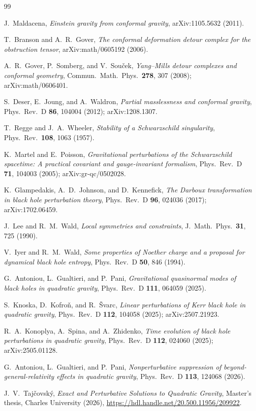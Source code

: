 \documentclass[11pt]{article}
\theoremstyle{definition}
\theoremstyle{remark}
\begin{document}
\begin{thebibliography}{99}

J.~Maldacena,
\emph{Einstein gravity from conformal gravity},
arXiv:1105.5632 (2011).

T.~Branson and A.~R.~Gover,
\emph{The conformal deformation detour complex for the obstruction tensor},
arXiv:math/0605192 (2006).

A.~R.~Gover, P.~Somberg, and V.~Sou\v cek,
\emph{Yang--Mills detour complexes and conformal geometry},
Commun.\ Math.\ Phys.\ \textbf{278}, 307 (2008);
arXiv:math/0606401.

S.~Deser, E.~Joung, and A.~Waldron,
\emph{Partial masslessness and conformal gravity},
Phys.\ Rev.\ D \textbf{86}, 104004 (2012);
arXiv:1208.1307.

T.~Regge and J.~A.~Wheeler,
\emph{Stability of a Schwarzschild singularity},
Phys.\ Rev.\ \textbf{108}, 1063 (1957).

K.~Martel and E.~Poisson,
\emph{Gravitational perturbations of the Schwarzschild spacetime: A
practical covariant and gauge-invariant formalism},
Phys.\ Rev.\ D \textbf{71}, 104003 (2005);
arXiv:gr-qc/0502028.

K.~Glampedakis, A.~D.~Johnson, and D.~Kennefick,
\emph{The Darboux transformation in black hole perturbation theory},
Phys.\ Rev.\ D \textbf{96}, 024036 (2017);
arXiv:1702.06459.

J.~Lee and R.~M.~Wald,
\emph{Local symmetries and constraints},
J.\ Math.\ Phys.\ \textbf{31}, 725 (1990).

V.~Iyer and R.~M.~Wald,
\emph{Some properties of Noether charge and a proposal for dynamical black
hole entropy},
Phys.\ Rev.\ D \textbf{50}, 846 (1994).

G.~Antoniou, L.~Gualtieri, and P.~Pani,
\emph{Gravitational quasinormal modes of black holes in quadratic gravity},
Phys.\ Rev.\ D \textbf{111}, 064059 (2025).

S.~Knoska, D.~Kofro\v n, and R.~\v Svarc,
\emph{Linear perturbations of Kerr black hole in quadratic gravity},
Phys.\ Rev.\ D \textbf{112}, 104058 (2025);
arXiv:2507.21923.

R.~A.~Konoplya, A.~Spina, and A.~Zhidenko,
\emph{Time evolution of black hole perturbations in quadratic gravity},
Phys.\ Rev.\ D \textbf{112}, 024060 (2025);
arXiv:2505.01128.

G.~Antoniou, L.~Gualtieri, and P.~Pani,
\emph{Nonperturbative suppression of beyond-general-relativity effects in
quadratic gravity},
Phys.\ Rev.\ D \textbf{113}, 124068 (2026).

J.~V.~Taj\v covsk\'y,
\emph{Exact and Perturbative Solutions to Quadratic Gravity},
Master's thesis, Charles University (2026),
\url{https://hdl.handle.net/20.500.11956/209922}.

\end{thebibliography}
\end{document}
